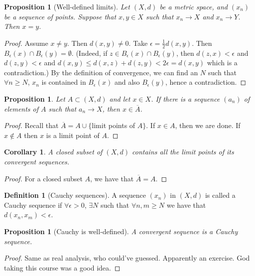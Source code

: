 \documentclass{article}
\theoremstyle{definition}
\newtheorem{defn}{Definition}[section]
\theoremstyle{plain}%
\newtheorem{prop}[thm]{Proposition}
\newtheorem*{cor}{Corollary}
\theoremstyle{remark}
\newcommand{\union}{\cup}
\begin{document}
\begin{prop}[Well-defined limits]
Let $(X,d)$ be a metric space, and $(x_n)$ be a sequence of points. Suppose that $x,y \in X$ such that $x_n \to X$ and $x_n \to Y$. Then $x=y$.
\end{prop}

\begin{proof}
Assume $x \ne y$. Then $d(x,y) \ne 0$. Take $\epsilon = \frac{1}{2} d(x,y)$. Then $B_{\epsilon}(x) \cap B_{\epsilon}(y) = \emptyset$. (Indeed, if $z \in B_{\epsilon}(x) \cap B_{\epsilon}(y)$, then $d(z,x) < \epsilon$ and $d(z,y) < \epsilon$ and $d(x,y) \le d(x,z) + d(z,y) < 2\epsilon = d(x,y)$ which is a contradiction.) By the definition of convergence, we can find an $N$ such that $\forall n \ge N$, $x_n$ is contained in $B_{\epsilon}(x)$ and also $B_{\epsilon}(y)$, hence a contradiction.
\end{proof}

\begin{prop}
Let $A \subset (X,d)$ and let $x \in X$. If there is a sequence $(a_n)$ of elements of $A$ such that $a_n \to X$, then $x \in \overline{A}$.
\end{prop}

\begin{proof}
Recall that $\overline{A} = A \union \{$limit points of $A \}$. If $x \in A$, then we are done. If $x \not\in A$ then $x$ is a limit point of $A$.
\end{proof}

\begin{cor}
A closed subset of $(X,d)$ contains all the limit points of its convergent sequences.
\end{cor}

\begin{proof}
For a closed subset $A$, we have that $\overline{A} = A$.
\end{proof}

\begin{defn}[Cauchy sequences]
A sequence $(x_n)$ in $(X,d)$ is called a Cauchy sequence if $\forall \epsilon > 0$, $\exists N$ such that $\forall n, m \ge N$ we have that $d(x_n, x_m) < \epsilon$.
\end{defn}

\begin{prop}[Cauchy is well-defined]
A convergent sequence is a Cauchy sequence.
\end{prop}

\begin{proof}
Same as real analysis, who could've guessed. Apparently an exercise. God taking this course was a good idea.
\end{proof}
\end{document}
